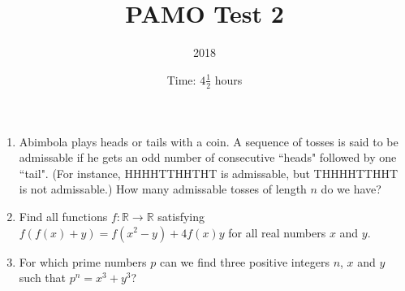\documentclass{article}
\title{PAMO Test 2}
\author{2018}
\date{Time: $4\frac{1}{2}$ hours}
\begin{document}
\maketitle

\begin{enumerate}

\item %
Abimbola plays heads or tails with a coin. A sequence of tosses is said to be
admissable if he gets an odd number of consecutive ``heads" followed by one
``tail". (For instance, HHHHTTHHTHT is admissable, but THHHHTTHHT is not
admissable.) How many admissable tosses of length $n$ do we have?

\item %
Find all functions $f: \mathbb{R} \to \mathbb{R}$ satisfying $f(f(x) + y) = f(x^2
- y) + 4f(x)y$ for all real numbers $x$ and $y$.

\item %
For which prime numbers $p$ can we find three positive integers $n$, $x$ and $y$
such that $p^n = x^3 + y^3$?

\end{enumerate}
\end{document}
